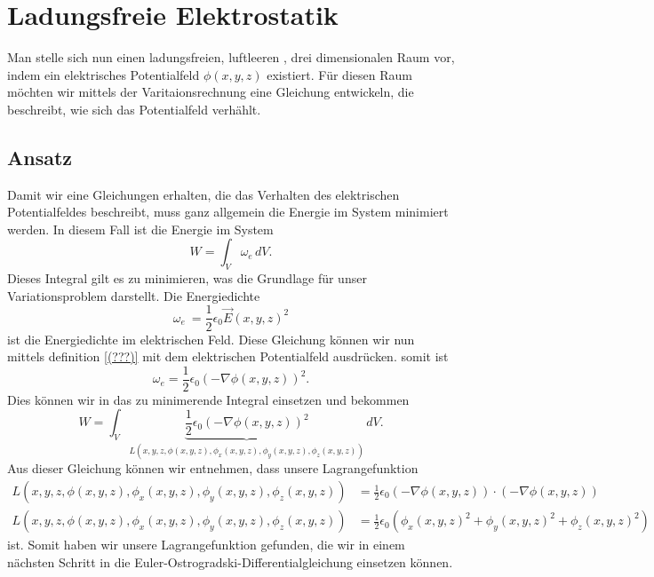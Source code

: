 \section{Ladungsfreie Elektrostatik
	\label{maxwell:section:equation1_ohne_quelle}}
Man stelle sich nun einen ladungsfreien, luftleeren , drei dimensionalen Raum vor, indem ein elektrisches Potentialfeld $\phi(x,y,z)$ existiert.
Für diesen Raum möchten wir mittels der Varitaionsrechnung eine Gleichung entwickeln, die beschreibt, wie sich das Potentialfeld verhählt. 

\subsection{Ansatz}
Damit wir eine Gleichungen erhalten, die das Verhalten des elektrischen Potentialfeldes beschreibt, muss ganz allgemein die Energie im System minimiert werden. 
In diesem Fall ist die Energie im System
\[
W
=
\int_V \omega_e\, dV.
\]
Dieses Integral gilt es zu minimieren, was die Grundlage für unser Variationsproblem darstellt.
Die Energiedichte
\[
\omega_e\
=
\frac{1}{2}\epsilon_0\vec{E}(x,y,z)^2
\]
ist die Energiedichte im elektrischen Feld.
Diese Gleichung können wir nun mittels definition \ref{(???)} mit dem elektrischen Potentialfeld ausdrücken.
somit ist
\[
\omega_e
=
\frac{1}{2}\epsilon_0\left(-\nabla\phi(x,y,z)\right)^2.
\]
Dies können wir in das zu minimerende Integral einsetzen und bekommen
\begin{equation}
	W
	=
	\int_V \underbrace{
		\frac{1}{2}\epsilon_0\left(-\nabla\phi(x,y,z)\right)^2}_{L(x,y,z,\phi(x,y,z),\phi_x(x,y,z),\phi_y(x,y,z),\phi_z(x,y,z))}\, dV.
	\label{maxwell:section:energieintegral_quellenfrei}
\end{equation}
Aus dieser Gleichung können wir entnehmen, dass unsere Lagrangefunktion
\begin{align}
	L(x,y,z,\phi(x,y,z),\phi_x(x,y,z),\phi_y(x,y,z),\phi_z(x,y,z))
	&=
	\frac{1}{2}\epsilon_0\left(-\nabla\phi(x,y,z)\right)\cdot\left(-\nabla\phi(x,y,z)\right)
	\\
	L(x,y,z,\phi(x,y,z),\phi_x(x,y,z),\phi_y(x,y,z),\phi_z(x,y,z))
	&=
	\frac{1}{2}\epsilon_0\left(\phi_x(x,y,z)^2 + \phi_y(x,y,z)^2 + \phi_z(x,y,z)^2\right)
	\label{maxwell:section:lagrangefunktion_quellenfrei}
\end{align}
ist.
Somit haben wir unsere Lagrangefunktion gefunden, die wir in einem nächsten Schritt in die Euler-Ostrogradski-Differentialgleichung einsetzen können.

